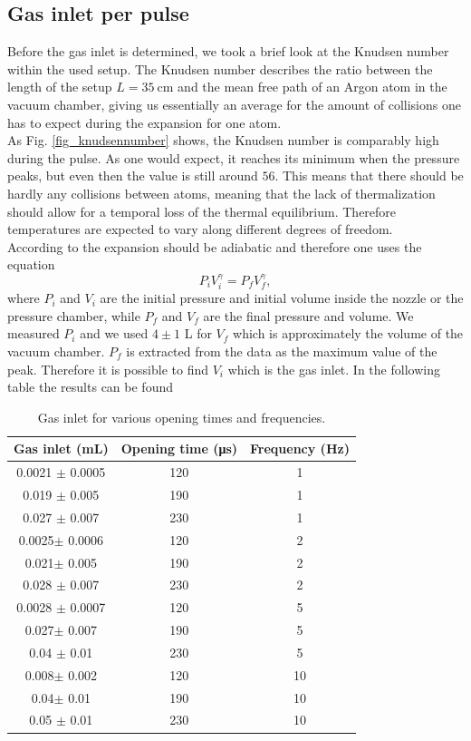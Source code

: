 \documentclass[a4paper,10pt]{article}
\begin{document}
\subsection{Gas inlet per pulse}
Before the gas inlet is determined, we took a brief look at the Knudsen number within the used setup. The Knudsen number describes the ratio between the length of the setup $L = \SI{35}{\centi \m}$ and the mean free path of an Argon atom in the vacuum chamber, giving us essentially an average for the amount of collisions one has to expect during the expansion for one atom. 
\\
As Fig. \ref{fig_knudsennumber} shows, the Knudsen number is comparably high during the pulse. As one would expect, it reaches its minimum when the pressure peaks, but even then the value is still around $56$. This means that there should be hardly any collisions between atoms, meaning that the lack of thermalization should allow for a temporal loss of the thermal equilibrium. Therefore temperatures are expected to vary along different degrees of freedom. 
\\
According to \cite{illinois} the expansion should be adiabatic and therefore one uses the equation 
\begin{equation}
	P_i V_i^\gamma = P_f V_f^\gamma,
\end{equation}
where $P_i$ and $V_i$ are the initial pressure and initial volume inside the nozzle or the pressure chamber, while $P_f$ and $V_f$ are the final pressure and volume. We measured $P_i$ and we used $4\pm 1$ L for $V_f$ which is approximately the volume of the vacuum chamber. $P_f$ is extracted from the data as the maximum value of the peak. Therefore it is possible to find $V_i$ which is the gas inlet. In the following table the results can be found
\begin{table}[H]
\centering
\caption{Gas inlet for various opening times and frequencies. }
\begin{tabular}{ccc} \toprule
    Gas inlet (mL) & Opening time (\si{\micro \s}) & Frequency (\si{\hertz}) \\ \midrule
0.0021 $\pm$ 0.0005 & 120& 1 \\
0.019 $\pm$ 0.005& 190& 1\\
0.027 $\pm$ 0.007 & 230& 1\\\midrule
0.0025$\pm$ 0.0006& 120& 2\\
0.021$\pm$ 0.005& 190& 2\\
0.028 $\pm$ 0.007& 230& 2\\\midrule
0.0028 $\pm$ 0.0007& 120& 5\\
0.027$\pm$ 0.007 & 190& 5\\
0.04 $\pm$ 0.01 & 230& 5\\\midrule
0.008$\pm$ 0.002& 120& 10\\
0.04$\pm$ 0.01& 190& 10\\
0.05 $\pm$ 0.01& 230& 10\\\bottomrule
\end{tabular}
\end{table}
\end{document}
